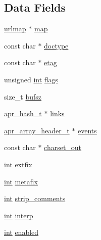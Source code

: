 \subsection*{Data Fields}
\begin{DoxyCompactItemize}
\item 
\hyperlink{structurlmap}{urlmap} $\ast$ \hyperlink{structproxy__html__conf_a2a8a79c94e0460192ffce1c172e79ccd}{map}
\item 
const char $\ast$ \hyperlink{structproxy__html__conf_ac838b496552f295b549d6cb2a2dc1fe4}{doctype}
\item 
const char $\ast$ \hyperlink{structproxy__html__conf_aee1356ad1055b90952b3b4dca8e7bc3b}{etag}
\item 
unsigned \hyperlink{pcre_8txt_a42dfa4ff673c82d8efe7144098fbc198}{int} \hyperlink{structproxy__html__conf_a0eecc1db08e797df1d19da790a129e15}{flags}
\item 
size\+\_\+t \hyperlink{structproxy__html__conf_a2347a296c793d55a8dec34ebcf8db420}{bufsz}
\item 
\hyperlink{structapr__hash__t}{apr\+\_\+hash\+\_\+t} $\ast$ \hyperlink{structproxy__html__conf_a5bee2ae6e4d45c3348e7ff7934320e55}{links}
\item 
\hyperlink{structapr__array__header__t}{apr\+\_\+array\+\_\+header\+\_\+t} $\ast$ \hyperlink{structproxy__html__conf_ae5c6148ee78ac3e5325d4b104474948c}{events}
\item 
const char $\ast$ \hyperlink{structproxy__html__conf_ad1eca9adefe080c3fa9d71943c5c580f}{charset\+\_\+out}
\item 
\hyperlink{pcre_8txt_a42dfa4ff673c82d8efe7144098fbc198}{int} \hyperlink{structproxy__html__conf_a23e4365c0f9f70d27ba51447dd1a1b5a}{extfix}
\item 
\hyperlink{pcre_8txt_a42dfa4ff673c82d8efe7144098fbc198}{int} \hyperlink{structproxy__html__conf_ada897d0c33eaec77b620f2f33f95ed6e}{metafix}
\item 
\hyperlink{pcre_8txt_a42dfa4ff673c82d8efe7144098fbc198}{int} \hyperlink{structproxy__html__conf_a3fbcf74d08936222624b6c051fcf42fa}{strip\+\_\+comments}
\item 
\hyperlink{pcre_8txt_a42dfa4ff673c82d8efe7144098fbc198}{int} \hyperlink{structproxy__html__conf_aa7d3709f6c3371f6d14e676032724ec2}{interp}
\item 
\hyperlink{pcre_8txt_a42dfa4ff673c82d8efe7144098fbc198}{int} \hyperlink{structproxy__html__conf_a098b4166a82e12c92b0d03a40d15ae40}{enabled}
\end{DoxyCompactItemize}



